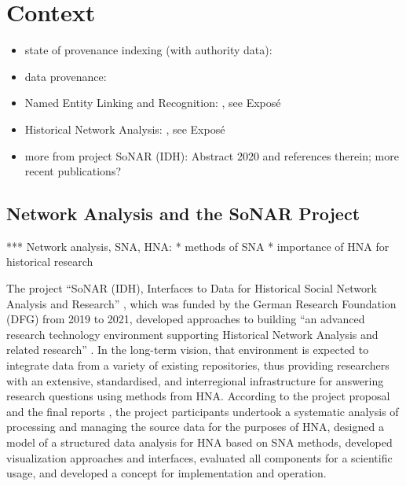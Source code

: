 \chapter{Context}
\label{chap:rel_work}
\label{chap:context}


\begin{itemize}
  \item
    state of provenance indexing (with authority data): \autocite{Hakelberg2016}
  \item
    data provenance: \autocite{Eckert2012}
  \item
    Named Entity Linking and Recognition: \autocite{Menzel2021, Meiners2022}, see Exposé
  \item 
    Historical Network Analysis: \autocite{Menzel2020}, see Exposé
  \item
    more from project SoNAR (IDH): Abstract 2020 and references therein; more recent publications?
\end{itemize}

\section{Network Analysis and the SoNAR Project}
\label{sec:HNA+SoNAR}

*** Network analysis, SNA, HNA:
* methods of SNA
* importance of HNA for historical research

The project \enquote{SoNAR (IDH),
Interfaces to Data for Historical Social Network Analysis
and Research} \autocite{Bludau2020,Menzel2020,SoNAR},
which was funded by the German Research Foundation (DFG)
from 2019 to 2021,
developed approaches to building 
\enquote{an advanced research technology environment
supporting Historical Network Analysis and related research} \autocite{SoNAR}.
In the long-term vision, that environment is expected to
integrate data from a variety of existing repositories,
thus providing researchers with an extensive,
standardised, and interregional infrastructure for answering research questions
using methods from HNA.
According to the project proposal and the final reports \autocite{SoNARreports},
the project participants undertook
a systematic analysis of processing and managing the source data
for the purposes of HNA,
designed a model of a structured data analysis for HNA based on SNA methods,
developed visualization approaches and interfaces,
evaluated all components for a scientific usage,
and developed a concept for implementation and operation.

